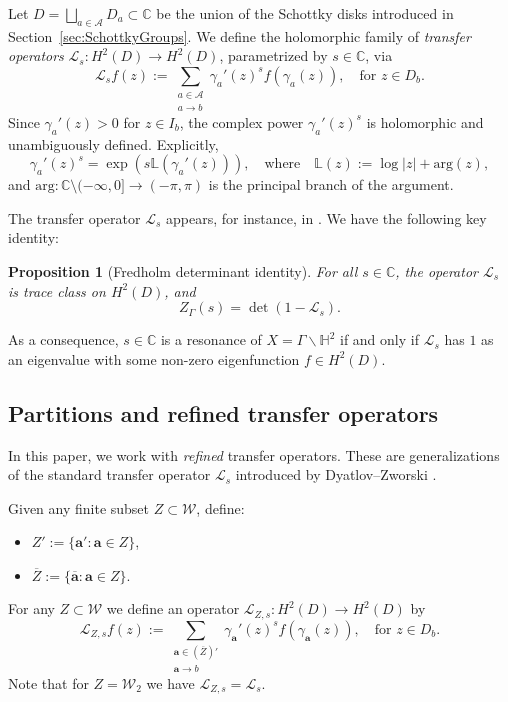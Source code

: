 \documentclass[12pt,letterpaper]{amsart}
\theoremstyle{plain}
\newtheorem{prop}{Proposition}[section]
\theoremstyle{definition}
\theoremstyle{remark}
\newcommand{\Aa}{\textbf{a}}
\newcommand{\HH}{\mathbb{H}}
\newcommand{\CC}{\mathbb{C}}
\begin{document}
Let $D = \bigsqcup_{a \in \mathcal{A}} D_a \subset \CC$ be the union of the Schottky disks introduced in Section~\ref{sec:SchottkyGroups}. We define the holomorphic family of \textit{transfer operators} $\mathcal{L}_s \colon H^2(D) \to H^2(D)$, parametrized by $s \in \CC$, via
\begin{equation}\label{transf_defi}
\mathcal{L}_s f(z) := \sum_{\substack{a \in \mathcal{A} \\ a \to b}} \gamma_a'(z)^s f(\gamma_a(z)), \quad \text{for } z \in D_b.
\end{equation}
Since $\gamma_a'(z) > 0$ for $z \in I_b$, the complex power $\gamma_a'(z)^s$ is holomorphic and unambiguously defined. Explicitly,
\begin{equation}\label{defi:principal_branch}
\gamma_a'(z)^s = \exp\left( s \mathbb{L}(\gamma_a'(z)) \right), \quad \text{where} \quad \mathbb{L}(z) := \log|z| + \mathrm{arg}(z),
\end{equation}
and $\mathrm{arg} \colon \CC \setminus (-\infty, 0] \to (-\pi, \pi)$ is the principal branch of the argument.

The transfer operator $\mathcal{L}_s$ appears, for instance, in \cite[Chapter~15]{Borthwick_book}. We have the following key identity:

\begin{prop}[Fredholm determinant identity]\label{prop:Fredholm_identity}
For all $s \in \CC$, the operator $\mathcal{L}_s$ is trace class on $H^2(D)$, and
\begin{equation}\label{Fredholm_identity_equation}
Z_\Gamma(s) = \det(1 - \mathcal{L}_s).
\end{equation}
\end{prop}

As a consequence, $s \in \CC$ is a resonance of $X = \Gamma \backslash \HH^2$ if and only if $\mathcal{L}_s$ has $1$ as an eigenvalue with some non-zero eigenfunction $f \in H^2(D)$.

\subsection{Partitions and refined transfer operators}\label{sec:partRefOp}
In this paper, we work with \textit{refined} transfer operators. These are generalizations of the standard transfer operator $\mathcal{L}_s$ introduced by Dyatlov–Zworski \cite{DyZw18}.

Given any finite subset $Z \subset \mathcal{W}$, define:
\begin{itemize}
  \item $Z' := \{ \Aa' : \Aa \in Z \}$,
  \item $\overline{Z} := \{ \overline{\Aa} : \Aa \in Z \}$.
\end{itemize}
For any $Z \subset \mathcal{W}$ we define an operator $\mathcal{L}_{Z,s} \colon H^2(D) \to H^2(D)$ by
\begin{equation}\label{generalizedOp}
\mathcal{L}_{Z,s}f(z) := \sum_{\substack{\Aa \in (\overline{Z})' \\ \Aa \to b}} \gamma_{\Aa}'(z)^s f(\gamma_{\Aa}(z)), \quad \text{for } z \in D_b.
\end{equation}
Note that for $Z=\mathcal{W}_2$ we have $\mathcal{L}_{Z,s} = \mathcal{L}_{s}.$
\end{document}
